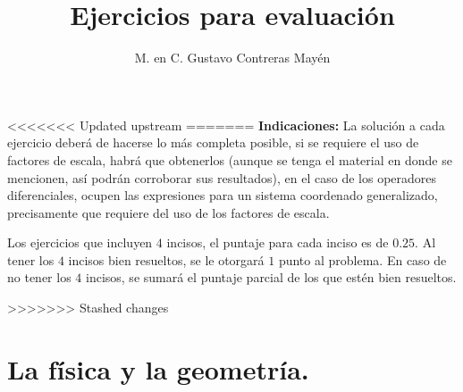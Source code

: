 
\title{Ejercicios para evaluación} \vspace{-3ex}
\author{M. en C. Gustavo Contreras Mayén}
\date{ }
\newcommand{\Cancel}[2][black]{{\color{#1}\cancel{\color{black}#2}}}


\vspace{-4cm}
\maketitle
\fontsize{14}{14}\selectfont

<<<<<<< Updated upstream
=======
\textbf{Indicaciones: } La solución a cada ejercicio deberá de hacerse lo más completa posible, si se requiere el uso de factores de escala, habrá que obtenerlos (aunque se tenga el material en donde se mencionen, así podrán corroborar sus resultados), en el caso de los operadores diferenciales, ocupen las expresiones para un sistema coordenado generalizado, precisamente que requiere del uso de los factores de escala.
\par
Los ejercicios que incluyen $4$ incisos, el puntaje para cada inciso es de $0.25$. Al tener los $4$ incisos bien resueltos, se le otorgará $1$ punto al problema. En caso de no tener los $4$ incisos, se sumará el puntaje parcial de los que estén bien resueltos.

>>>>>>> Stashed changes
\section{La física y la geometría.}

